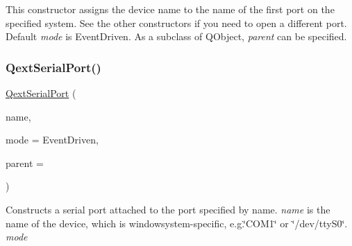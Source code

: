\begin{DoxyCode}{0}
\DoxyCodeLine{-------------     -------------   ------------------------}
\end{DoxyCode}


This constructor assigns the device name to the name of the first port on the specified system. See the other constructors if you need to open a different port. Default {\itshape mode} is Event\+Driven. As a subclass of Q\+Object, {\itshape parent} can be specified. \mbox{\label{class_qext_serial_port_ab0376896b79bb9dc099bf102f01e5afa}} 
\subsubsection{\texorpdfstring{QextSerialPort()}{QextSerialPort()}\hspace{0.1cm}{\footnotesize\ttfamily [2/4]}}
{\footnotesize\ttfamily \mbox{\hyperlink{class_qext_serial_port}{Qext\+Serial\+Port}} (\begin{DoxyParamCaption}\item[{const Q\+String \&}]{name,  }\item[{\mbox{\hyperlink{class_qext_serial_port_a269e1f3656224a10c321bd70ab89cf64}{Qext\+Serial\+Port\+::\+Query\+Mode}}}]{mode = {\ttfamily EventDriven},  }\item[{Q\+Object $\ast$}]{parent = {} }\end{DoxyParamCaption})\hspace{0.3cm}{\ttfamily [explicit]}}

Constructs a serial port attached to the port specified by name. {\itshape name} is the name of the device, which is windowsystem-\/specific, e.\+g.\char`\"{}\+C\+O\+M1\char`\"{} or \char`\"{}/dev/tty\+S0\char`\"{}. {\itshape mode} \mbox{\label{class_qext_serial_port_a990ab7ac41bbfe2e9ec2e247145bd49e}} 
